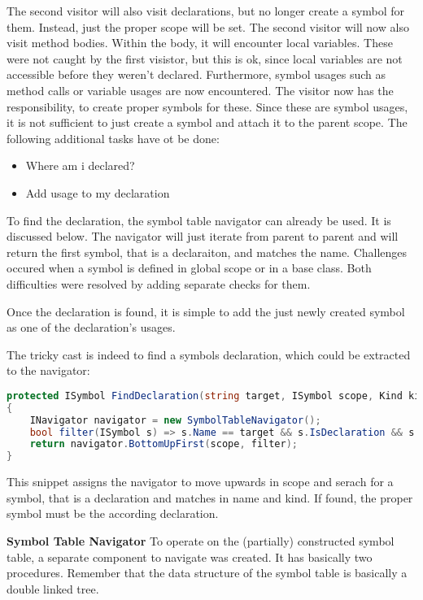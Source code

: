 The second visitor will also visit declarations, but no longer create a symbol for them. Instead, just the proper scope will be set. The second visitor will now also visit method bodies. Within the body, it will encounter local variables. These were not caught by the first visistor, but this is ok, since local variables are not accessible before they weren't declared.  Furthermore, symbol usages such as method calls or variable usages are now encountered. The visitor now has the responsibility, to create proper symbols for these. Since these are symbol usages, it is not sufficient to just create a symbol and attach it to the parent scope. The following additional tasks have ot be done:
\begin{itemize}
    \item Where am i declared?
    \item Add usage to my declaration
\end{itemize}

To find the declaration, the symbol table navigator can already be used. It is discussed below. The navigator will just iterate from parent to parent and will return the first symbol, that is a declaraiton, and matches the name. Challenges occured when a symbol is defined in global scope or in a base class. Both difficulties were resolved by adding separate checks for them.

Once the declaration is found, it is simple to add the just newly created symbol as one of the declaration's usages.

The tricky cast is indeed to find a symbols declaration, which could be extracted to the navigator:

\begin{lstlisting}[language=csharp, caption={Finding a Declaration}, captionpos=b, label={lst:visitorfinddecl}]
protected ISymbol FindDeclaration(string target, ISymbol scope, Kind kind)
{
    INavigator navigator = new SymbolTableNavigator();
    bool filter(ISymbol s) => s.Name == target && s.IsDeclaration && s.Kind == kind;
    return navigator.BottomUpFirst(scope, filter);
}
\end{lstlisting}
This snippet assigns the navigator to move upwards in scope and serach for a symbol, that is a declaration and matches in name and kind. If found, the proper symbol must be the according declaration.

\textbf{Symbol Table Navigator}
To operate on the (partially) constructed symbol table, a separate component to navigate was created. It has basically two procedures. Remember that the data structure of the symbol table is basically a double linked tree.

